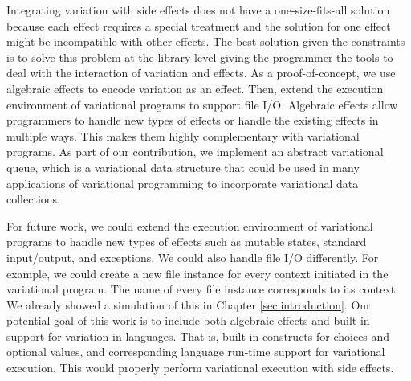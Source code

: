Integrating variation with side effects does not have a one-size-fits-all solution because each effect requires a special treatment and the solution for one effect might be incompatible with other effects. The best solution given the constraints is to solve this problem at the library level giving the programmer the tools to deal with the interaction of variation and effects. As a proof-of-concept, we use algebraic effects to encode variation as an effect. Then, extend the execution environment of variational programs to support file I/O. Algebraic effects allow programmers to handle new types of effects or handle the existing effects in multiple ways. This makes them highly complementary with variational programs. As part of our contribution, we implement an abstract variational queue, which is a variational data structure that could be used in many applications of variational programming to incorporate variational data collections. 

For future work, we could extend the execution environment of variational programs to handle new types of effects such as mutable states, standard input/output, and exceptions. We could also handle file I/O differently. For example, we could create a new file instance for every context initiated in the variational program. The name of every file instance corresponds to its context. We already showed a simulation of this in Chapter \ref{sec:introduction}. Our potential goal of this work is to include both algebraic effects and built-in support for variation in languages. That is, built-in constructs for choices and optional values, and corresponding language run-time support for variational execution. This would properly perform variational execution with side effects.

